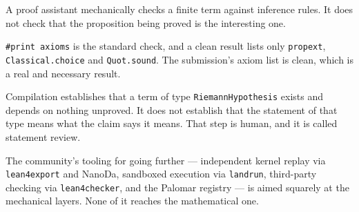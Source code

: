 \begin{keytakeaways}

\item A proof assistant mechanically checks a finite term against inference
rules. It does not check that the proposition being proved is the interesting
one.
\item \texttt{\#print axioms} is the standard check, and a clean result lists
only \texttt{propext}, \texttt{Classical.choice} and \texttt{Quot.sound}. The
submission's axiom list is clean, which is a real and necessary result.
\item Compilation establishes that a term of type \texttt{RiemannHypothesis}
exists and depends on nothing unproved. It does not establish that the
statement of that type means what the claim says it means. That step is
human, and it is called statement review.
\item The community's tooling for going further --- independent kernel replay
via \texttt{lean4export} and NanoDa, sandboxed execution via
\texttt{landrun}, third-party checking via \texttt{lean4checker}, and the
Palomar registry --- is aimed squarely at the mechanical layers. None of it
reaches the mathematical one.
\end{keytakeaways}
